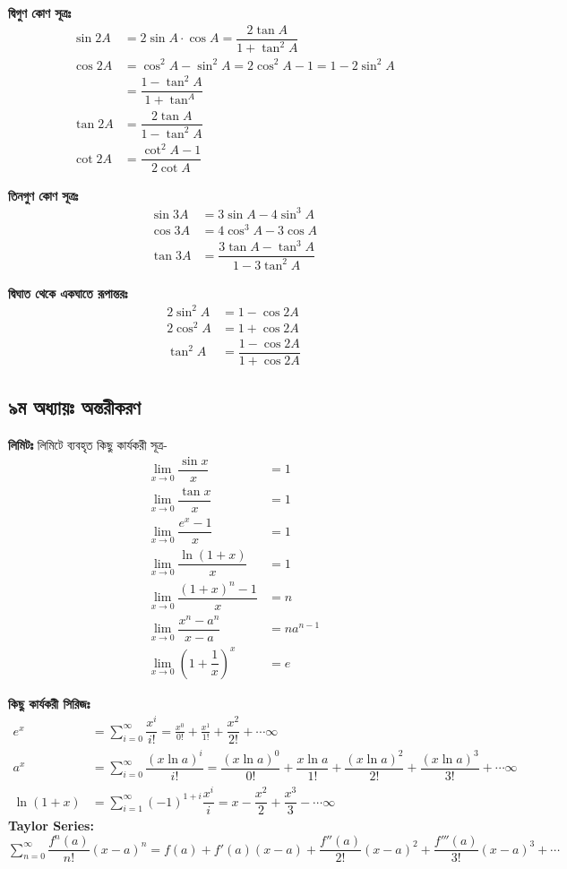 \documentclass[a4paper,12pt]{article}
\newcommand{\dd}{\displaystyle}
\newcommand{\eng}{\textenglish}
\begin{document}
\textbf{দ্বিগুণ কোণ সূত্রঃ}
\begin{align*}
    \sin 2A &= 2\sin A \cdot \cos A = \dfrac{2\tan A}{1+ \tan^2 A}\\
    \cos 2A &= \cos^2A-\sin^2A= 2\cos^2A-1 = 1-2\sin^2A\\
    &= \dfrac{1-\tan^2A}{1+\tan^A}\\
    \tan 2A &= \dfrac{2\tan A}{1-\tan^2A}\\
    \cot 2A &= \dfrac{\cot^2A-1}{2\cot A}
\end{align*} 

\textbf{তিনগুণ কোণ সূত্রঃ}
\begin{align*}
    \sin 3A &= 3\sin A-4\sin^3A\\
    \cos 3A &= 4\cos^3A-3\cos A\\
    \tan 3A &= \dfrac{3\tan A-\tan^3A}{1-3\tan^2A}
\end{align*} 

\textbf{দ্বিঘাত থেকে একঘাতে রূপান্তরঃ}\label{3}
\begin{align*}
    2\sin^2 A &= 1-\cos 2A\\
    2\cos^2 A &= 1+\cos 2A\\
    \tan^2A &= \dfrac{1-\cos 2A}{1+ \cos 2A}
\end{align*} 

\subsection{৯ম অধ্যায়ঃ অন্তরীকরণ}

\textbf{লিমিটঃ} লিমিটে ব্যবহৃত কিছু কার্যকরী সূত্র- 
\begin{align*}
    \lim_{x \to 0} \dfrac{\sin x}{x} &=1\\
    \lim_{x \to 0} \dfrac{\tan x}{x} &=1\\
    \lim_{x \to 0} \dfrac{e^x-1}{x} &=1\\
    \lim_{x \to 0} \dfrac{\ln(1+x)}{x} &=1\\
    \lim_{x \to 0} \dfrac{(1+x)^n-1}{x} &=n\\
    \lim_{x \to 0} \dfrac{x^n-a^n}{x-a} &=na^{n-1}\\
    \lim_{x \to 0} (1+\dfrac{1}{x})^x &=e
\end{align*} 

\textbf{কিছু কার্যকরী সিরিজঃ}
\begin{align*}
    e^x &=\sum_{i=0}^{\infty} \dfrac{x^i}{i!} = \frac{x^0}{0!}+\frac{x^1}{1!}+\dfrac{x^2}{2!}+ \cdots \infty\\
    a^x &= \sum_{i=0}^{\infty} \dfrac{( x \ln a)^i}{i!}=\dfrac{( x \ln a)^0}{0!}+\dfrac{x \ln a}{1!}+\dfrac{ (x \ln a)^2}{2!}+\dfrac{ (x \ln a)^3}{3!}+\cdots \infty\\
    \ln(1+x) &= \sum_{i=1}^{\infty} (-1)^{1+i}\dfrac{x^i}{i} = x-\dfrac{x^2}{2}+\dfrac{x^3}{3}-\cdots \infty
\end{align*}
\textbf{\eng{Taylor Series:}} $\dd \sum_{n=0}^{\infty} \dfrac{f^n(a)}{n!}(x-a)^n=f(a)+f'(a)(x-a)+\dfrac{f''(a)}{2!}(x-a)^2+\dfrac{f'''(a)}{3!}(x-a)^3+ \cdots $
\end{document}
